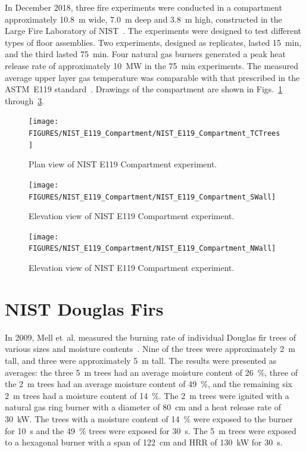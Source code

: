 In December 2018, three fire experiments were conducted in a compartment approximately 10.8~m wide, 7.0~m deep and 3.8~m high, constructed in the Large Fire Laboratory of NIST~\cite{Ana:TNXXXX}. The experiments were designed to test different types of floor assemblies. Two experiments, designed as replicates, lasted 15~min, and the third lasted 75~min. Four natural gas burners generated a peak heat release rate of approximately 10~MW in the 75~min experiments. The measured average upper layer gas temperature was comparable with that prescribed in the ASTM~E119 standard~\cite{E119}. Drawings of the compartment are shown in Figs.~\ref{NIST_E119_Compartment_Drawing_1} through~\ref{NIST_E119_Compartment_Drawing_3}.

\begin{figure}
\texttt{[image: FIGURES/NIST\_E119\_Compartment/NIST\_E119\_Compartment\_TCTrees]}
\caption[Plan view of NIST E119 Compartment experiment]{Plan view of NIST E119 Compartment experiment.}
\label{NIST_E119_Compartment_Drawing_1}
\end{figure}

\begin{figure}
\texttt{[image: FIGURES/NIST\_E119\_Compartment/NIST\_E119\_Compartment\_SWall]}
\caption[Elevation view of NIST E119 Compartment experiment]{Elevation view of NIST E119 Compartment experiment.}
\label{NIST_E119_Compartment_Drawing_2}
\end{figure}

\begin{figure}
\texttt{[image: FIGURES/NIST\_E119\_Compartment/NIST\_E119\_Compartment\_NWall]}
\caption[Elevation view of NIST E119 Compartment experiment]{Elevation view of NIST E119 Compartment experiment.}
\label{NIST_E119_Compartment_Drawing_3}
\end{figure}

\FloatBarrier

\section{NIST Douglas Firs}
\label{NIST_Douglas_Firs_Description}

In 2009, Mell et~al. measured the burning rate of individual Douglas fir trees of various sizes and moisture contents~\cite{Mell:2009}. Nine of the trees were approximately 2~m tall, and three were approximately 5~m tall. The results were presented as averages: the three 5~m trees had an average moisture content of 26~\%, three of the 2~m trees had an average moisture content of 49~\%, and the remaining six 2~m trees had a moisture content of 14~\%. The 2~m trees were ignited with a natural gas ring burner with a diameter of 80~cm and a heat release rate of 30~kW. The trees with a moisture content of 14~\% were exposed to the burner for 10~s and the 49~\% trees were exposed for 30~s. The 5~m trees were exposed to a hexagonal burner with a span of 122~cm and HRR of 130~kW for 30~s.


